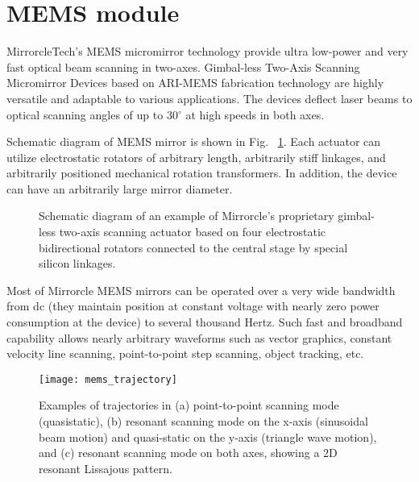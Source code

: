 \section{MEMS module}

MirrorcleTech's MEMS micromirror technology provide ultra low-power and very fast optical beam scanning in two-axes.
Gimbal-less Two-Axis Scanning Micromirror Devices based on ARI-MEMS fabrication technology are highly versatile and adaptable to various applications.  The devices deflect laser beams to optical scanning angles of up to 30$^\circ$ at high speeds in both axes. 


Schematic diagram of MEMS mirror is shown in Fig. ~\ref{fig:mems_scheme}.
Each actuator can utilize
electrostatic rotators of arbitrary length, arbitrarily stiff linkages, and arbitrarily positioned mechanical rotation
transformers. In addition, the device can have an arbitrarily large mirror diameter.

\begin{figure}[h]
\vspace{1cm} 
\caption{Schematic diagram of an example of Mirrorcle’s proprietary gimbal-less two-axis scanning actuator based on four electrostatic bidirectional rotators connected to the central stage by special silicon linkages.}
\label{fig:mems_scheme} 
\end{figure}


Most of Mirrorcle MEMS mirrors can be operated over a very wide bandwidth from dc (they maintain position at constant voltage with nearly zero power consumption at the device) to several thousand Hertz. Such fast and broadband capability allows nearly arbitrary waveforms such as vector graphics, constant velocity line scanning, point-to-point step scanning, object tracking, etc.

\begin{figure}[h]
\texttt{[image: mems\_trajectory]}

\caption{Examples of trajectories in (a) point-to-point scanning mode (quasistatic), (b) resonant
scanning mode on the x-axis (sinusoidal beam motion) and quasi-static on the y-axis (triangle wave motion), and (c) resonant scanning mode on both axes, showing a 2D resonant Lissajous pattern.}%

\label{fig:mems_trajectories} %
\end{figure}


